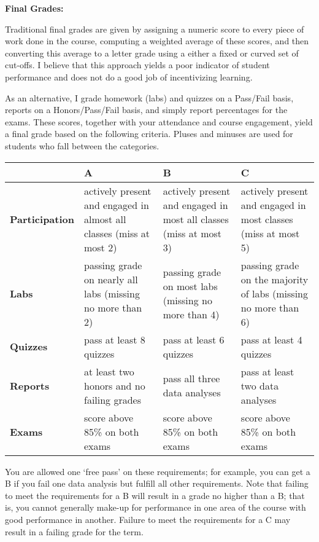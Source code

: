 \documentclass[12pt]{article}
\begin{document}
\vspace{0.4cm}

\textbf{Final Grades:} \vspace{6pt}

Traditional final grades are given by assigning a numeric score
to every piece of work done in the course, computing a weighted
average of these scores, and then converting this average to a
letter grade using a either a fixed or curved set of cut-offs.
I believe that this approach yields a poor indicator of student
performance and does not do a good job of incentivizing learning.

\bigskip

As an alternative, I grade homework (labs) and quizzes on a Pass/Fail
basis, reports on a Honors/Pass/Fail basis, and simply report
percentages for the exams. These scores, together with your
attendance and course engagement, yield a final grade based on
the following criteria. Pluses and minuses are used for students
who fall between the categories.

\begin{center}
\begin{tabular}{p{2.5cm}|p{4cm}|p{4cm}|p{4cm}}
& \quad \textbf{A} & \quad \textbf{B} & \quad \textbf{C} \\ \hline \hline
\textbf{Participation} & actively present and engaged in almost all classes (miss at most 2) & actively present and engaged in most all classes (miss at most 3)  & actively present and engaged in most classes (miss at most 5)  \\ \hline
\textbf{Labs} & passing grade on nearly all labs (missing no more than 2) & passing grade on most labs (missing no more than 4) & passing grade on the majority of labs (missing no more than 6) \\ \hline
\textbf{Quizzes} & pass at least 8 quizzes & pass at least 6 quizzes & pass at least 4 quizzes \\ \hline
\textbf{Reports} & at least two honors and no failing grades & pass all three data analyses & pass at least two data analyses \\ \hline
\textbf{Exams} & score above 85\% on both exams & score above 85\% on both exams & score above 85\% on both exams\\ \hline
\end{tabular}
\end{center}

You are allowed one `free pass' on these requirements; for example, you
can get a B if you fail one data analysis but fulfill all other
requirements. Note that failing to meet the requirements for a B will
result in a grade no higher than a B; that is, you cannot generally
make-up for performance in one area of the course with good performance
in another. Failure to meet the requirements for a C may result in a
failing grade for the term.
\end{document}
